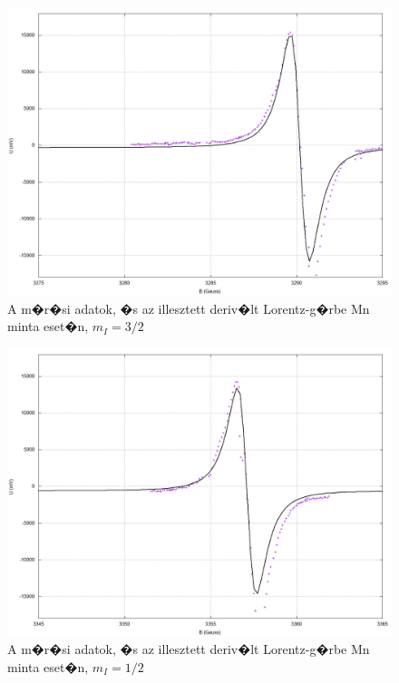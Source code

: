 \documentclass[a4paper,12pt]{article}
\begin{document}
\begin{figure}[H]
\includegraphics[width=15cm]{Mn2.png}
\centering
\caption{A m�r�si adatok, �s az illesztett deriv�lt Lorentz-g�rbe Mn minta eset�n, $m_I = 3/2$}
\label{fig:5}
\end{figure}

\begin{figure}[H]
\includegraphics[width=15cm]{Mn3.png}
\centering
\caption{A m�r�si adatok, �s az illesztett deriv�lt Lorentz-g�rbe Mn minta eset�n, $m_I = 1/2$}
\label{fig:6}
\end{figure}
\end{document}
